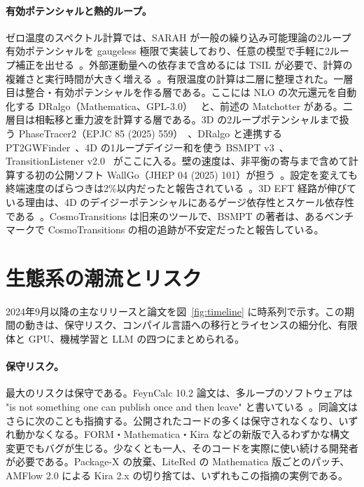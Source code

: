 \documentclass[a4paper,10pt]{ltjsarticle}
\begin{document}
\paragraph{有効ポテンシャルと熱的ループ。}ゼロ温度のスペクトル計算では、SARAH が一般の繰り込み可能理論の2ループ有効ポテンシャルを gaugeless 極限で実装しており、任意の模型で手軽に2ループ補正を出せる~\cite{r151}。外部運動量への依存まで含めるには TSIL が必要で、計算の複雑さと実行時間が大きく増える~\cite{r152}。有限温度の計算は二層に整理された。一層目は整合・有効ポテンシャルを作る層である。ここには NLO の次元還元を自動化する DRalgo（Mathematica、GPL-3.0）~\cite{r153} と、前述の Matchotter がある。二層目は相転移と重力波を計算する層である。3D の2ループポテンシャルまで扱う PhaseTracer2（EPJC 85 (2025) 559）~\cite{r154}、DRalgo と連携する PT2GWFinder~\cite{r155}、4D の1ループデイジー和を使う BSMPT v3~\cite{r156}、TransitionListener v2.0~\cite{r157} がここに入る。壁の速度は、非平衡の寄与まで含めて計算する初の公開ソフト WallGo（JHEP 04 (2025) 101）が担う~\cite{r158}。設定を変えても終端速度のばらつきは2\%以内だったと報告されている~\cite{r159}。3D EFT 経路が伸びている理由は、4D のデイジーポテンシャルにあるゲージ依存性とスケール依存性である~\cite{r160}。CosmoTransitions は旧来のツールで、BSMPT の著者は、あるベンチマークで CosmoTransitions の相の追跡が不安定だったと報告している。


\section{生態系の潮流とリスク}\label{sec:trends}

2024年9月以降の主なリリースと論文を図~\ref{fig:timeline} に時系列で示す。この期間の動きは、保守リスク、コンパイル言語への移行とライセンスの細分化、有限体と GPU、機械学習と LLM の四つにまとめられる。

\paragraph{保守リスク。}最大のリスクは保守である。FeynCalc 10.2 論文は、多ループのソフトウェアは "is not something one can publish once and then leave" と書いている~\cite{r10}。同論文はさらに次のことも指摘する。公開されたコードの多くは保守されなくなり、いずれ動かなくなる。FORM・Mathematica・Kira などの新版で入るわずかな構文変更でもバグが生じる。少なくとも一人、そのコードを実際に使い続ける開発者が必要である。Package-X の放棄、LiteRed の Mathematica 版ごとのパッチ、AMFlow 2.0 による Kira 2.x の切り捨ては、いずれもこの指摘の実例である。
\end{document}
